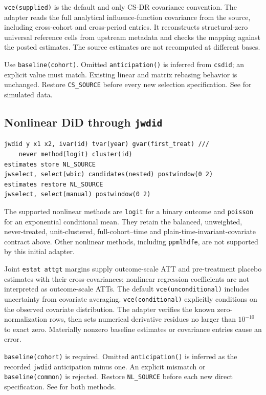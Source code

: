 \documentclass[11pt]{article}
\newcommand{\cmd}[1]{\texttt{#1}}
\begin{document}
\cmd{vce(supplied)} is the default and only CS-DR covariance convention.
The adapter reads the full analytical influence-function covariance from the
source, including cross-cohort and cross-period entries. It reconstructs
structural-zero universal reference cells from upstream metadata and checks
the mapping against the posted estimates. The source estimates are not
recomputed at different bases.

Use \cmd{baseline(cohort)}. Omitted \cmd{anticipation()} is inferred from
\cmd{csdid}; an explicit value must match. Existing linear and matrix
rebasing behavior is unchanged. Restore \cmd{CS\_SOURCE} before every new
selection specification. See  for simulated data.

\subsection{Nonlinear DiD through \texttt{jwdid}}
\begin{lstlisting}
jwdid y x1 x2, ivar(id) tvar(year) gvar(first_treat) ///
    never method(logit) cluster(id)
estimates store NL_SOURCE
jwselect, select(wbic) candidates(nested) postwindow(0 2)
estimates restore NL_SOURCE
jwselect, select(manual) postwindow(0 2)
\end{lstlisting}
The supported nonlinear methods are \cmd{logit} for a binary outcome and
\cmd{poisson} for an exponential conditional mean. They retain the balanced,
unweighted, never-treated, unit-clustered, full-cohort--time and
plain-time-invariant-covariate contract above. Other nonlinear methods,
including \cmd{ppmlhdfe}, are not supported by this initial adapter.

Joint \cmd{estat attgt} margins supply outcome-scale ATT and pre-treatment
placebo estimates with their cross-covariances; nonlinear regression
coefficients are not interpreted as outcome-scale ATTs. The default
\cmd{vce(unconditional)} includes uncertainty from covariate averaging.
\cmd{vce(conditional)} explicitly conditions on the observed covariate
distribution. The adapter verifies the known zero-normalization rows, then
sets numerical derivative residues no larger than $10^{-10}$ to exact zero.
Materially nonzero baseline estimates or covariance entries cause an error.

\cmd{baseline(cohort)} is required. Omitted \cmd{anticipation()} is inferred
as the recorded \cmd{jwdid} anticipation minus one. An explicit mismatch or
\cmd{baseline(common)} is rejected. Restore \cmd{NL\_SOURCE} before each new
direct specification. See  for both methods.
\end{document}

